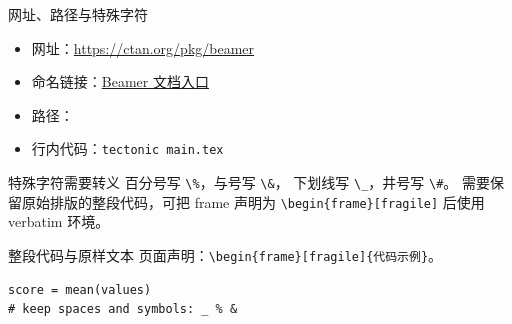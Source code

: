 \begin{frame}{网址、路径与特殊字符}
  \begin{itemize}
    \item 网址：\url{https://ctan.org/pkg/beamer}
    \item 命名链接：\href{https://ctan.org/pkg/beamer}{Beamer 文档入口}
    \item 路径：
    \item 行内代码：\texttt{tectonic main.tex}
  \end{itemize}

  \begin{block}{特殊字符需要转义}
    百分号写 \texttt{\textbackslash\%}，与号写 \texttt{\textbackslash\&}，
    下划线写 \texttt{\textbackslash\_}，井号写 \texttt{\textbackslash\#}。
    需要保留原始排版的整段代码，可把 frame 声明为
    \texttt{\textbackslash begin\{frame\}[fragile]} 后使用 verbatim 环境。
  \end{block}
\end{frame}

\begin{frame}[fragile]{整段代码与原样文本}
  页面声明：\verb|\begin{frame}[fragile]{代码示例}|。
  \begin{verbatim}
score = mean(values)
# keep spaces and symbols: _ % &
  \end{verbatim}
\end{frame}
